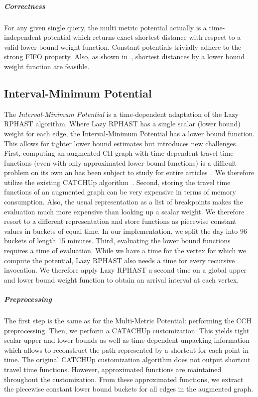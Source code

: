 \documentclass[a4paper,UKenglish,cleveref, autoref, thm-restate,anonymous]{lipics-v2021}
\begin{document}
\subparagraph{Correctness}
For any given single query, the multi metric potential actually is a time-independent potential which returns exact shortest distance with respect to a valid lower bound weight function.
Constant potentials trivially adhere to the strong FIFO property.
Also, as shown in~\cite{strasser_et_al:LIPIcs.SEA.2021.6}, shortest distances by a lower bound weight function are feasible.

\subsection{Interval-Minimum Potential}

The \emph{Interval-Minimum Potential} is a time-dependent adaptation of the Lazy RPHAST algorithm.
Where Lazy RPHAST has a single scalar (lower bound) weight for each edge, the Interval-Minimum Potential has a lower bound function.
This allows for tighter lower bound estimates but introduces new challenges.
First, computing an augmented CH graph with time-dependent travel time functions (even with only approximated lower bound functions) is a difficult problem on its own an has been subject to study for entire articles~\cite{bgsv-mtdtt-13,swz-sfert-21}.
We therefore utilize the existing CATCHUp algorithm~\cite{swz-sfert-21}.
Second, storing the travel time functions of an augmented graph can be very expensive in terms of memory consumption.
Also, the usual representation as a list of breakpoints makes the evaluation much more expensive than looking up a scalar weight.
We therefore resort to a different representation and store functions as piecewise constant values in buckets of equal time.
In our implementation, we split the day into 96 buckets of length 15 minutes.
Third, evaluating the lower bound functions requires a time of evaluation.
While we have a time for the vertex for which we compute the potential, Lazy RPHAST also needs a time for every recursive invocation.
We therefore apply Lazy RPHAST a second time on a global upper and lower bound weight function to obtain an arrival interval at each vertex.

\subparagraph{Preprocessing}
The first step is the same as for the Multi-Metric Potential: performing the CCH preprocessing.
Then, we perform a CATACHUp customization.
This yields tight scalar upper and lower bounds as well as time-dependent unpacking information which allows to reconstruct the path represented by a shortcut for each point in time.
The original CATCHUp customization algorithm does not output shortcut travel time functions.
However, approximated functions are maintained throughout the customization.
From these approximated functions, we extract the piecewise constant lower bound buckets for all edges in the augmented graph.
\end{document}
